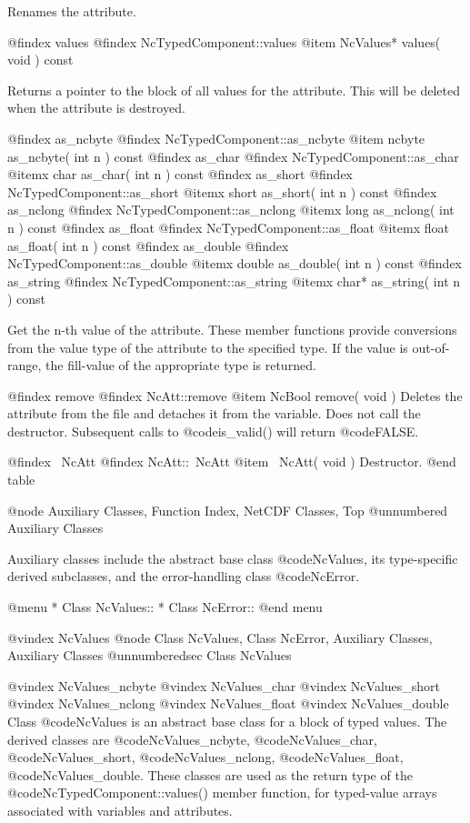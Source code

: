 Renames the attribute.

@findex values
@findex NcTypedComponent::values
@item NcValues* values( void ) const

Returns a pointer to the block of all values for the
attribute.  This will be deleted when the attribute is
destroyed.

@findex as_ncbyte
@findex NcTypedComponent::as_ncbyte
@item ncbyte as_ncbyte( int n ) const
@findex as_char
@findex NcTypedComponent::as_char
@itemx char as_char( int n ) const
@findex as_short
@findex NcTypedComponent::as_short
@itemx short as_short( int n ) const
@findex as_nclong
@findex NcTypedComponent::as_nclong
@itemx long as_nclong( int n ) const
@findex as_float
@findex NcTypedComponent::as_float
@itemx float as_float( int n ) const
@findex as_double
@findex NcTypedComponent::as_double
@itemx double as_double( int n ) const
@findex as_string
@findex NcTypedComponent::as_string
@itemx char* as_string( int n ) const

Get the n-th value of the attribute.  These member functions provide
conversions from the value type of the attribute to the specified type.
If the value is out-of-range, the fill-value of the appropriate type is
returned.

@findex remove
@findex NcAtt::remove
@item NcBool remove( void )
Deletes the attribute from the file and detaches it from the variable.
Does not call the destructor.  Subsequent calls to @code{is_valid()} will
return @code{FALSE}.

@findex ~NcAtt
@findex NcAtt::~NcAtt
@item ~NcAtt( void )
Destructor.
@end table

@node Auxiliary Classes, Function Index, NetCDF Classes, Top
@unnumbered  Auxiliary Classes

Auxiliary classes include the abstract base class @code{NcValues}, its
type-specific derived subclasses, and the error-handling class
@code{NcError}.

@menu
* Class NcValues::              
* Class NcError::               
@end menu

@vindex NcValues
@node Class NcValues, Class NcError, Auxiliary Classes, Auxiliary Classes
@unnumberedsec  Class NcValues

@vindex NcValues_ncbyte
@vindex NcValues_char
@vindex NcValues_short
@vindex NcValues_nclong
@vindex NcValues_float
@vindex NcValues_double
Class @code{NcValues} is an abstract base class for a block of typed
values.  The derived classes are @code{NcValues_ncbyte},
@code{NcValues_char}, @code{NcValues_short}, @code{NcValues_nclong},
@code{NcValues_float}, @code{NcValues_double}.
These classes are used as the return type of the
@code{NcTypedComponent::values()} member function, for typed-value
arrays associated with variables and attributes.

